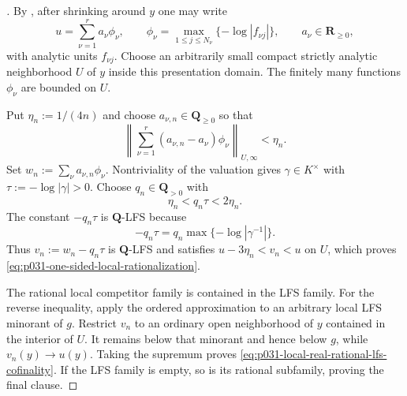 \begin{proof}[]
By \cite[\S7.9, p.~190]{GJR26}, after shrinking around $y$ one may write
\[
 u=\sum_{\nu=1}^{r}a_\nu\phi_\nu,
 \qquad
 \phi_\nu=\max_{1\leq j\leq N_\nu}\{-\log|f_{\nu j}|\},
 \qquad a_\nu\in\mathbf R_{\geq0},
\]
with analytic units $f_{\nu j}$.  Choose an arbitrarily small compact
strictly analytic neighborhood $U$ of $y$ inside this presentation domain.
The finitely many functions $\phi_\nu$ are bounded on $U$.

Put $\eta_n:=1/(4n)$ and choose $a_{\nu,n}\in\mathbf Q_{\geq0}$ so that
\[
 \left\|\sum_{\nu=1}^{r}(a_{\nu,n}-a_\nu)\phi_\nu
 \right\|_{U,\infty}<\eta_n.
\]
Set $w_n:=\sum_\nu a_{\nu,n}\phi_\nu$.  Nontriviality of the valuation
gives $\gamma\in K^\times$ with $\tau:=-\log|\gamma|>0$.  Choose
$q_n\in\mathbf Q_{>0}$ with
\[
                         \eta_n<q_n\tau<2\eta_n.
\]
The constant $-q_n\tau$ is $\mathbf Q$-LFS because
\[
              -q_n\tau=q_n\max\{-\log|\gamma^{-1}|\}.
\]
Thus $v_n:=w_n-q_n\tau$ is $\mathbf Q$-LFS and satisfies
$u-3\eta_n<v_n<u$ on $U$, which proves
\eqref{eq:p031-one-sided-local-rationalization}.

The rational local competitor family is contained in the LFS family.  For
the reverse inequality, apply the ordered approximation to an arbitrary
local LFS minorant of $g$.  Restrict $v_n$ to an ordinary open neighborhood
of $y$ contained in the interior of $U$.  It remains below that minorant and
hence below $g$, while $v_n(y)\to u(y)$.  Taking the supremum proves
\eqref{eq:p031-local-real-rational-lfs-cofinality}.  If the LFS family is
empty, so is its rational subfamily, proving the final clause.
\end{proof}

